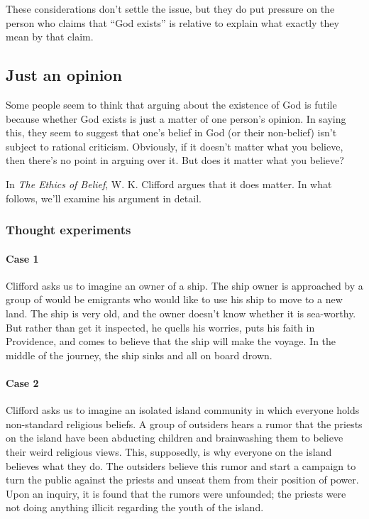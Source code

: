 \documentclass[letterpaper,10pt]{article}
\begin{document}
These considerations don't settle the issue, but they do put pressure on the person who claims that ``God exists'' is relative to explain what exactly they mean by that claim.

\subsection{Just an opinion}
Some people seem to think that arguing about the existence of God is futile because whether God exists is just a matter of one person's opinion. In saying this, they seem to suggest that one's belief in God (or their non-belief) isn't subject to rational criticism. Obviously, if it doesn't matter what you believe, then there's no point in arguing over it.  But does it matter what you believe?

In \textit{The Ethics of Belief}, W. K. Clifford argues that it does matter.  In what follows, we'll examine his argument in detail.

\subsubsection{Thought experiments}

\paragraph{Case 1} Clifford asks us to imagine an owner of a ship. The ship owner is approached by a group of would be emigrants who would like to use his ship to move to a new land. The ship is very old, and the owner doesn't know whether it is sea-worthy.  But rather than get it inspected, he quells his worries, puts his faith in Providence, and comes to believe that the ship will make the voyage. In the middle of the journey, the ship sinks and all on board drown.

\paragraph{Case 2} Clifford asks us to imagine an isolated island community in which everyone holds non-standard religious beliefs. A group of outsiders hears a rumor that the priests on the island have been abducting children and brainwashing them to believe their weird religious views.  This, supposedly, is why everyone on the island believes what they do.  The outsiders believe this rumor and start a campaign to turn the public against the priests and unseat them from their position of power.  Upon an inquiry, it is found that the rumors were unfounded; the priests were not doing anything illicit regarding the youth of the island.
\end{document}
